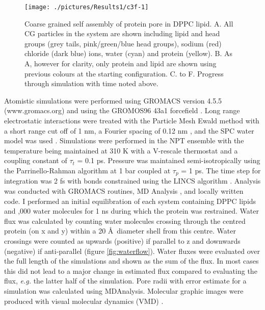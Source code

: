 \begin{figure}[H]
\begin{center}
\texttt{[image: ./pictures/Results1/c3f-1]}
\caption[Coarse grained self assembly of protein pore in DPPC lipid ] {Coarse grained self assembly of protein pore in DPPC lipid. A. All CG particles in the system are shown including lipid and head groups (grey tails, pink/green/blue head groups), sodium (red) chloride (dark blue) ions, water (cyan) and protein (yellow). B. As  A, however for clarity, only protein and lipid are shown using previous colours at the starting configuration. C. to F. Progress through simulation with time noted above.} 
\label{fig:c3f-1}
\end{center}
\end{figure}

Atomistic simulations were performed using GROMACS version 4.5.5 \cite{Hess2008} \\(www.gromacs.org) and using the GROMOS96 43a1 forcefield \cite{Scott1999,Schuler2001}. Long range electrostatic interactions were treated with the Particle Mesh Ewald method with a short range cut off of 1 nm, a Fourier spacing of 0.12 nm \cite{Darden1993,Essmann1995}, and the SPC water model was used \cite{Berendsen1987a}. Simulations were performed in the NPT ensemble with the temperature being maintained at 310 K with a V-rescale thermostat \cite{Bussi2007d} and a coupling constant of $\tau${$_t$} = 0.1 ps. Pressure was maintained semi-isotropically using the Parrinello-Rahman \cite{Parrinello1981} algorithm at 1 bar coupled at $\tau${$_p$} = 1 ps. The time step for integration was 2 fs with bonds constrained using the LINCS algorithm \cite{Hess1997a}. Analysis was conducted with GROMACS routines, MD Analysis \cite{Michaud-Agrawal2011}, and locally written code. I performed an initial equilibration of each system containing  DPPC lipids and ,000 water molecules for 1 ns during which the protein was restrained. Water flux was calculated by counting water molecules crossing through the centred protein (on x and y) within a 20 \AA\ diameter shell from this centre. Water crossings were counted as upwards (positive) if parallel to z and downwards (negative) if anti-parallel (figure \ref{fig:waterflow}). Water fluxes were evaluated over the full length of the simulations and shown as the sum of the flux. In most cases this did not lead to a major change in estimated flux compared to evaluating the flux, \textit{e.g.} the latter half of the simulation. Pore radii with error estimate for a simulation was calculated using MDAnalysis. Molecular graphic images were produced with visual molecular dynamics (VMD) \cite{Humphrey1996}.


